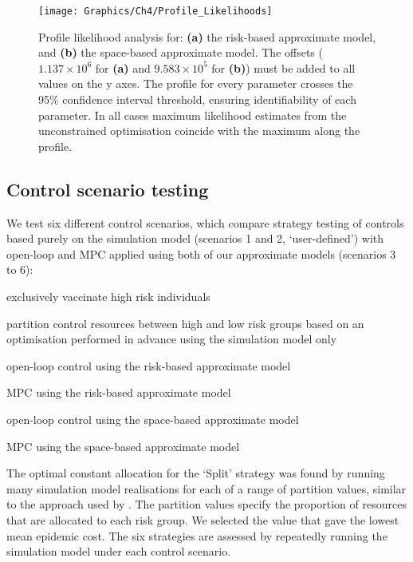 \begin{figure}
    \begin{center}
        \texttt{[image: Graphics/Ch4/Profile\_Likelihoods]}
        \caption[Profile likelihood analysis for the approximate models]{Profile likelihood analysis for: \textbf{(a)} the risk-based approximate model, and \textbf{(b)} the space-based approximate model. The offsets ($1.137\times10^6$ for \textbf{(a)} and $9.583\times10^5$ for \textbf{(b)}) must be added to all values on the y axes. The profile for every parameter crosses the 95\% confidence interval threshold, ensuring identifiability of each parameter. In all cases maximum likelihood estimates from the unconstrained optimisation coincide with the maximum along the profile.}
        \label{fig:profile_lik}
    \end{center}
\end{figure}

\FloatBarrier
\subsection{Control scenario testing}

We test six different control scenarios, which compare strategy testing of controls based purely on the simulation model (scenarios 1 and 2, `user-defined') with open-loop and MPC applied using both of our approximate models (scenarios 3 to 6):
\begin{description}[labelwidth =\widthof{\bfseries6. `Space MPC':}, leftmargin = !]
    \setlength{\itemsep}{3pt}%
    \setlength{\parskip}{3pt}%
    \setlength{\parsep}{3pt}%
    \item[1. `High':] exclusively vaccinate high risk individuals
    \item[2. `Split':] partition control resources between high and low risk groups based on an optimisation performed in advance using the simulation model only
    \item[3. `Risk OL':] open-loop control using the risk-based approximate model
    \item[4. `Risk MPC':] MPC using the risk-based approximate model
    \item[5. `Space OL':] open-loop control using the space-based approximate model
    \item[6. `Space MPC':] MPC using the space-based approximate model
\end{description}

The optimal constant allocation for the `Split' strategy was found by running many simulation model realisations for each of a range of partition values, similar to the approach used by \citet{cunniffe_optimising_2015}. The partition values specify the proportion of resources that are allocated to each risk group. We selected the value that gave the lowest mean epidemic cost. The six strategies are assessed by repeatedly running the simulation model under each control scenario.

